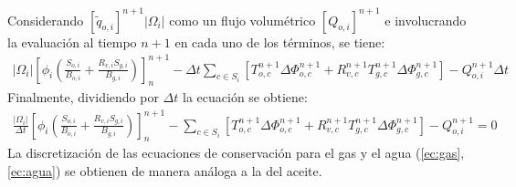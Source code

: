 \begin{appendix}
Considerando $\left[\tilde{q}_{o,i}\right]^{n+1} |\Omega_{i}|$ como un flujo volumétrico $\left[Q_{o,i}\right]^{n+1}$ e involucrando la evaluación al tiempo $n+1$ en cada uno de los términos, se tiene:
\begin{align*}
|\Omega_{i}|\left[ \phi_{i} \left( \frac{S_{o,i}}{B_{o,i}} + \frac{R_{v,i} S_{g,i}}{B_{g,i}} \right) \right]^{n+1}_{n} - \Delta t \sum_{c \in S_{i}} \left[ T_{o,c}^{n+1} \Delta \Phi_{o,c}^{n+1} + R_{v,c}^{n+1} T_{g,c}^{n+1} \Delta \Phi_{g,c}^{n+1} \right] - Q_{o,i}^{n+1} \Delta t
\end{align*}
Finalmente, dividiendo por $\Delta t$ la ecuación se obtiene:
\begin{align*}
\frac{|\Omega_{i}|}{\Delta t}\left[ \phi_{i} \left( \frac{S_{o,i}}{B_{o,i}} + \frac{R_{v,i} S_{g,i}}{B_{g,i}} \right) \right]^{n+1}_{n} - \sum_{c \in S_{i}} \left[ T_{o,c}^{n+1} \Delta \Phi_{o,c}^{n+1} + R_{v,c}^{n+1} T_{g,c}^{n+1} \Delta \Phi_{g,c}^{n+1} \right] - Q_{o,i}^{n+1} = 0
\end{align*}
La discretización de las ecuaciones de conservación para el gas y el agua (\ref{ec:gas}, \ref{ec:agua}) se obtienen de manera análoga a la del aceite.
%

\end{appendix}
